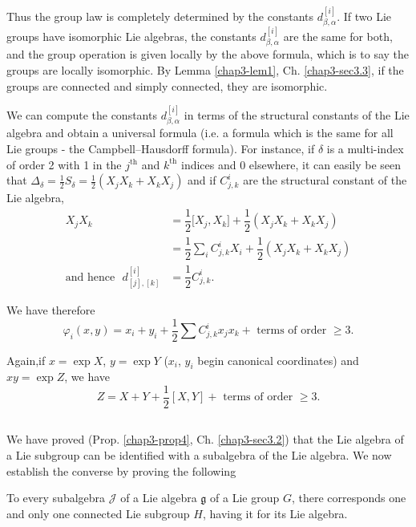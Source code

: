 Thus the group law is completely determined by the constants $ d
^{[i]}  _{\beta, \alpha}$.  
If two Lie groups have isomorphic Lie algebras, the constants $
d^{[i]}_{\beta, \alpha}$ are the same for both, and the group
operation is given  locally by the  above formula, which is to say the
groups are locally isomorphic. By Lemma \ref{chap3-lem1},
Ch. \ref{chap3-sec3.3}, if the groups are 
connected and simply connected, they are isomorphic. 

We can compute the constants $d^{[i]}_{\beta, \alpha}$  in terms
of the structural constants of the Lie  algebra and obtain a universal
formula (i.e. a formula which is the same for all Lie groups - the
Campbell--Hausdorff formula). For instance, if $\delta$ is a multi-index
of order 2 with 1 in the $j^{\text{th}}$ and $k^{\text{th}}$ indices and  $0$
elsewhere, it can easily be seen that $\Delta_\delta
=\frac{1}{2}S_\delta =\frac{1}{2}(X_j X_k+ X_k X_j)$  and if
$C^i_{j,k}$ are the structural constant of the Lie algebra,  
\begin{align*}
X_j X_k & = \dfrac{1}{2}\big[ X_j, X_k\big]+ \dfrac{1}{2}(X_j X_k +
X_k X_j)\\ 
& = \dfrac{1}{2}\sum_{i} C^i_{j,k} X_i+\dfrac{1}{2}(X_j X_k +
X_k X_j)\\ 
\text{and hence~ } d^{[i]}_{[j],[k]}& = \dfrac{1}{2} C^i _{j,k}.
\end{align*}

We have therefore
$$
\varphi_i (x,y) = x_i + y_i + \dfrac{1}{2} \sum C^i_{j,k} x_j x_k +
\text{ terms of order }  \ge 3.  
 $$

Again,\pageoriginale if $x = \exp X$, $y = \exp Y$ ($x_{i}$, $y_{i}$
begin canonical coordinates) and $xy = \exp Z$, we have 
$$
Z = X + Y + \dfrac{1}{2}[X, Y] + \text{ terms of order } \ge 3.
$$ 

\subsection{}\label{chap4-sec4.4}%

We have proved (Prop. \ref{chap3-prop4}, Ch. \ref{chap3-sec3.2}) that
the Lie algebra of a Lie 
subgroup can be identified with a subalgebra of the Lie algebra. We
now establish the converse by proving the following 

\begin{thm}\label{chap4-thm3}%
{To every subalgebra} $\mathscr{J}$ {of a Lie algebra} $\mathfrak{g}$
{of a Lie group} $G$, {there corresponds one and only one
  connected Lie subgroup} $H$, {having it for its Lie algebra}. 
\end{thm}

